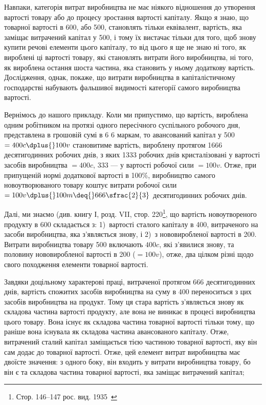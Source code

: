
Навпаки, категорія витрат виробництва не має ніякого відношення
до утворення вартості товару або до процесу зростання
вартості капіталу. Якщо я знаю, що  товарної вартості
в 600, або 500, становлять
тільки еквівалент, вартість, яка заміщає витрачений капітал
у 500, і тому їх вистачає тільки для того, щоб
знову купити речові елементи цього капіталу, то від цього
я ще не знаю ні того, як вироблені ці   вартості товару, які
становлять витрати його виробництва, ні того, як вироблена
остання шоста частина, яка становить у ньому додаткову вартість.
Дослідження, однак, покаже, що витрати виробництва в капіталістичному
господарстві набувають фальшивої видимості категорії
самого виробництва вартості.

Вернімось до нашого прикладу. Коли ми припустимо, що вартість,
вироблена одним робітником на протязі одного пересічного
суспільного робочого дня, представлена в грошовій сумі
в 6 \deq{} 6 маркам, то авансований капітал у 500 $= 400 c \dplus{} 100 v$ становитиме вартість, вироблену протягом
1666 десятигодинних робочих днів, з яких 1333 робочих
днів кристалізовані у вартості засобів виробництва $= 400 c$,
333  — у вартості робочої сили $= 100v$. Отже, при припущеній
нормі додаткової вартості в 100\%, виробництво самого новоутворюваного
товару коштує витрати робочої сили $= 100v \dplus{} 100m \deq{} 666\sfrac{2}{3}$ десятигодинних робочих днів.

Далі, ми знаємо (див. книгу І, розд. VII, стор. 220\footnote*{Стор. 146--147 рос. вид. 1935~ }, що вартість
новоутвореного продукту в 600 складається
з: 1)~вартості сталого капіталу в 400,
витраченого на засоби виробництва, яка з’являється знову, і
2)~з нововиробленої вартості в 200. Витрати
виробництва товару \deq{} 500 включають $400 c$,
які з’явилися знову, та половину нововиробленої вартості в
200 ($= 100 v$), отже, два цілком різні щодо
свого походження елементи товарної вартості.

Завдяки доцільному характерові праці, витраченої протягом
666  десятигодинних днів, вартість спожитих засобів виробництва
на суму в 400 переноситься з цих
засобів виробництва на продукт. Тому ця стара вартість з’являється
знову як складова частина вартості продукту, але вона
не виникає в процесі виробництва цього товару. Вона існує як
складова частина товарної вартості тільки тому, що раніше вона
існувала як складова частина авансованого капіталу. Отже, витрачений
сталий капітал заміщається тією частиною товарної
вартості, яку він сам додає до товарної вартості. Отже, цей
елемент витрат виробництва має двоїсте значення: з одного боку,
він входить у витрати виробництва товару, бо він є та складова
частина товарної вартості, яка заміщає витрачений капітал;
\parbreak{}  %
